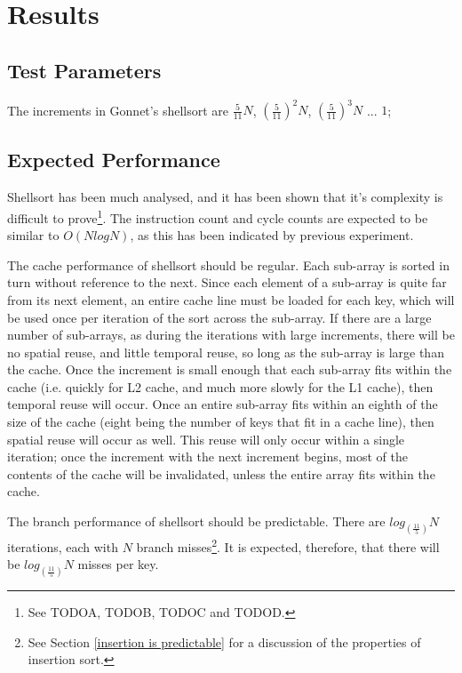 
\section{Results}
\subsection{Test Parameters}
The increments in Gonnet's shellsort are $\frac{5}{11}N$, $(\frac{5}{11})^2N$,
$(\frac{5}{11})^3N$ ... $1$;

\subsection{Expected Performance}
Shellsort has been much analysed, and it has been shown that it's complexity is
difficult to prove\footnote{See TODOA, TODOB, TODOC and TODOD.}. The instruction
count and cycle counts are expected to be similar to $O(NlogN)$, as this has
been indicated by previous experiment. 

The cache performance of shellsort should be regular. Each sub-array is sorted in
turn without reference to the next. Since each element of a sub-array is quite
far from its next element, an entire cache line must be loaded for each key,
which will be used once per iteration of the sort across the sub-array. If there
are a large number of sub-arrays, as during the iterations with large increments,
there will be no spatial reuse, and little temporal reuse, so long as the
sub-array is large than the cache. Once the increment is small enough that each
sub-array fits within the cache (i.e. quickly for L2 cache, and much more slowly
for the L1 cache), then temporal reuse will occur. Once an entire sub-array fits
within an eighth of the size of the cache (eight being the number of keys
that fit in a cache line), then spatial reuse will occur as well.  This reuse
will only occur within a single iteration; once the increment with the next
increment begins, most of the contents of the cache will be invalidated, unless
the entire array fits within the cache.

The branch performance of shellsort should be predictable. There are
$log_{(\frac{11}{5})}N$ iterations, each with $N$ branch misses\footnote{See Section
\ref{insertion is predictable} for a discussion of the properties of insertion
sort.}. It is expected, therefore, that there will be $log_{(\frac{11}{5})}N$ misses per
key.

